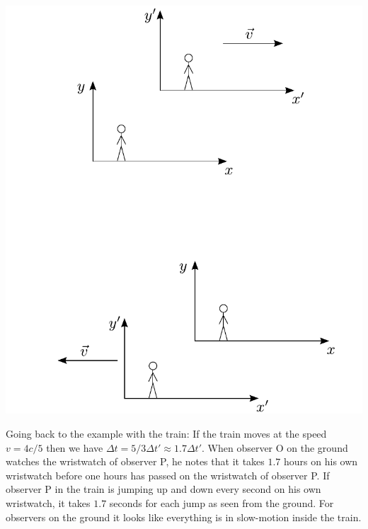 {\begin{multicols}{2}
\begin{Figure}
\centering
\includegraphics[width=\textwidth]{fig_7-7.pdf}
\end{Figure}

Going back to the example with the train: If the train moves at the speed $v=4c/5$ then we have $\Delta t=5/3\Delta t'\approx1.7\Delta t'$. When observer O on the ground watches the wristwatch of observer P, he notes that it takes $1.7$ hours on his own wristwatch before one hours has passed on the wristwatch of observer P. If observer P in the train is jumping up and down every second on his own wristwatch, it takes $1.7$ seconds for each jump as seen from the ground. For observers on the ground it looks like everything is in slow-motion inside the train.


\end{multicols}}
